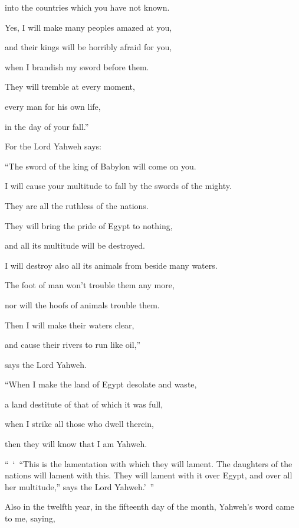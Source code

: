 {\par }{\QB into the countries which you have not known.
\par }{\Q {}Yes, I will make many peoples amazed at you,
\par }{\QB and their kings will be horribly afraid for you,
\par }{\Q when I brandish my sword before them.
\par }{\QB They will tremble at every moment,
\par }{\Q every man for his own life,
\par }{\QB in the day of your fall.”
\par }{\Q {}For the Lord Yahweh says:
\par }{\QB “The sword of the king of Babylon will come on you.
\par }{\Q {}I will cause your multitude to fall by the swords of the mighty.
\par }{\QB They are all the ruthless of the nations.
\par }{\Q They will bring the pride of Egypt to nothing,
\par }{\QB and all its multitude will be destroyed.
\par }{\Q {}I will destroy also all its animals from beside many waters.
\par }{\QB The foot of man won’t trouble them any more,
\par }{\QB nor will the hoofs of animals trouble them.
\par }{\Q {}Then I will make their waters clear,
\par }{\QB and cause their rivers to run like oil,”
\par }{\QB says the Lord Yahweh.
\par }{\Q {}“When I make the land of Egypt desolate and waste,
\par }{\QB a land destitute of that of which it was full,
\par }{\Q when I strike all those who dwell therein,
\par }{\QB then they will know that I am Yahweh.
\par }{\PP {}“ ‘ “This is the lamentation with which they will lament. The daughters of the nations will lament with this. They will lament with it over Egypt, and over all her multitude,” says the Lord Yahweh.’ ”
\par }{\BB \par }{\PP {}Also in the twelfth year, in the fifteenth day of the month, Yahweh’s word came to me, saying,
}
